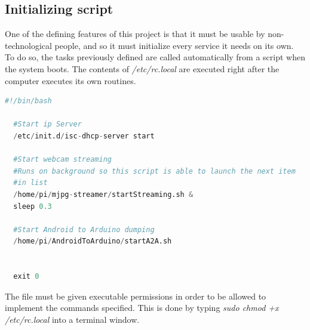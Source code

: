 












\subsection{Initializing script} 

One of the defining features of this project is that it must be usable by non-technological people, and so it must initialize every service it needs on its own. \\

To do so, the tasks previously defined are called automatically from a script when the system boots. The contents of \textit{/etc/rc.local} are executed right after the computer executes its own routines.\\


	\begin{minipage}{\linewidth}%
	\begin{lstlisting}[label=rc.local,caption=Initialization Script {[} /etc/rc.local {]} ,language=python ]
  #!/bin/bash

  #Start ip Server
  /etc/init.d/isc-dhcp-server start

  #Start webcam streaming 
  #Runs on background so this script is able to launch the next item 
  #in list
  /home/pi/mjpg-streamer/startStreaming.sh &
  sleep 0.3

  #Start Android to Arduino dumping
  /home/pi/AndroidToArduino/startA2A.sh 


  exit 0


	\end{lstlisting}
	\end{minipage}

\bigskip
The file must be given executable permissions in order to be allowed to implement the commands specified. This is done by typing \textit{sudo chmod +x /etc/rc.local} into a terminal window.